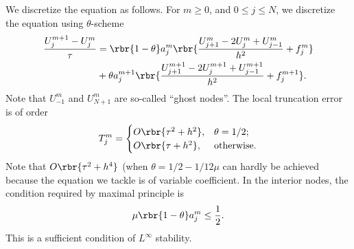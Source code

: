 \documentclass[english, nochinese]{pnote}
\begin{document}
We discretize the equation as follows. For $ m \ge 0 $, and $ 0 \le j \le N $, we discretize the equation using $\theta$-scheme
\begin{equation}
\begin{split}
\frac{ U_j^{ m + 1 } - U_j^m }{\tau} &= \rbr{ 1 - \theta } a_j^m \rbr{ \frac{ U_{ j + 1 }^m - 2 U_j^m + U_{ j - 1 }^m }{h^2} + f_j^m } \\
&+ \theta a_j^{ m + 1 } \rbr{ \frac{ U_{ j + 1 }^{ m + 1 } - 2 U_j^{ m + 1 } + U_{ j - 1 }^{ m + 1 } }{h^2} + f_j^{ m + 1 } }.
\end{split}
\end{equation}
Note that $U_{-1}^m$ and $ U_{ N + 1 }^m $ are so-called ``ghost nodes''. The local truncation error is of order
\begin{equation}
T_j^m =
\begin{cases}
O \rbr{ \tau^2 + h^2 }, & \theta = 1 / 2; \\
O \rbr{ \tau + h^2 }, & \text{otherwise}.
\end{cases}
\end{equation}
Note that $ O \rbr{ \tau^2 + h^4 } $ (when $ \theta = 1 / 2 - 1 / 12 \mu $ can hardly be achieved because the equation we tackle is of variable coefficient. In the interior nodes, the condition required by maximal principle is
\begin{equation}
\mu \rbr{ 1 - \theta } a_j^m \le \frac{1}{2}.
\end{equation}
This is a sufficient condition of $L^{\infty}$ stability.
\end{document}
